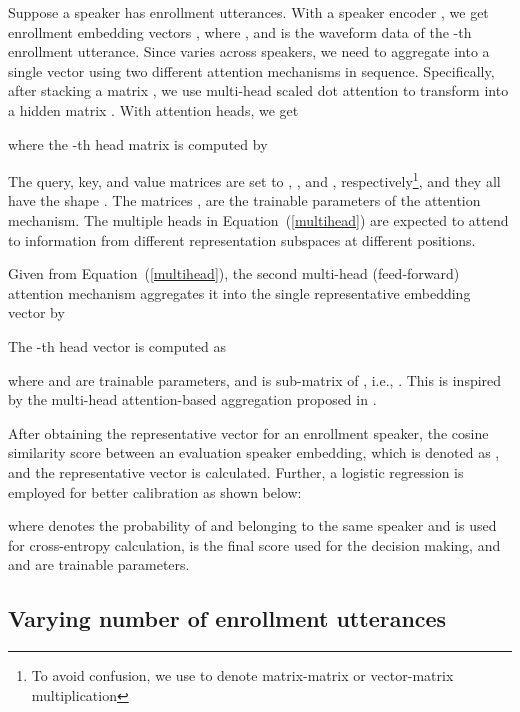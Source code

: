 \documentclass[a4paper]{article}
\begin{document}
Suppose a speaker has  enrollment utterances. With a speaker encoder ,  we get  enrollment embedding vectors , where , and  is the waveform data of the -th enrollment utterance.
Since  varies across speakers, we need to aggregate  into a single vector  using two different attention mechanisms in sequence. Specifically, after stacking a matrix , we use multi-head scaled dot attention \cite{Vaswani2017-Attention} to transform  into a hidden matrix . With  attention heads, we get 

where the -th head matrix  is computed by

The query, key, and value matrices are set to , , and , respectively\footnote{To avoid confusion, we use  to denote matrix-matrix or vector-matrix multiplication}, and they all have the shape . The matrices ,  are the trainable parameters of the attention mechanism. 
The multiple heads in Equation~(\ref{multihead}) are expected to attend to information from different representation subspaces at different positions. 


Given  from Equation~(\ref{multihead}), the second multi-head (feed-forward) attention mechanism aggregates it into the single representative embedding vector  by 

The -th head vector  is computed as

where  and  are trainable parameters, and  is sub-matrix of , i.e., .
This is inspired by the multi-head attention-based aggregation proposed in \cite{Lin2017-StructureATT}.

After obtaining the representative vector for an enrollment speaker, the cosine similarity score between an evaluation speaker embedding, which is denoted as , and the representative vector  is calculated. Further, a logistic regression is employed for better calibration as shown below:

where  denotes the probability of  and  belonging to the same speaker and is used for cross-entropy calculation,  is the final score used for the decision making, and  and  are trainable parameters.













\vspace{-1mm}
\subsection{Varying number of enrollment utterances}
\end{document}
